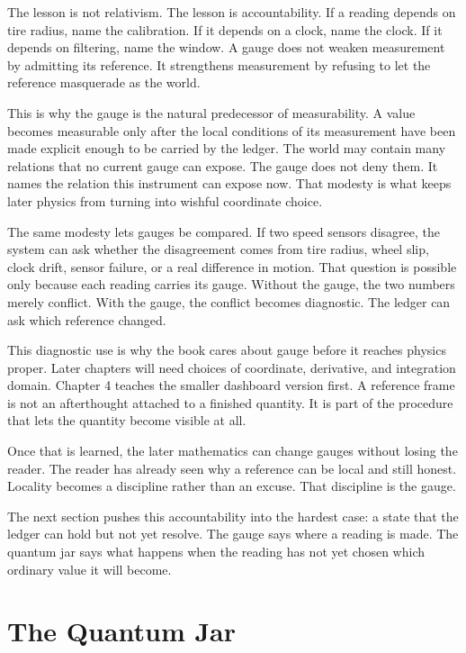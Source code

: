 The lesson is not relativism. The lesson is accountability. If a reading
depends on tire radius, name the calibration. If it depends on a clock, name
the clock. If it depends on filtering, name the window. A gauge does not weaken
measurement by admitting its reference. It strengthens measurement by refusing
to let the reference masquerade as the world.

This is why the gauge is the natural predecessor of measurability. A value
becomes measurable only after the local conditions of its measurement have been
made explicit enough to be carried by the ledger. The world may contain many
relations that no current gauge can expose. The gauge does not deny them. It
names the relation this instrument can expose now. That modesty is what keeps
later physics from turning into wishful coordinate choice.

The same modesty lets gauges be compared. If two speed sensors disagree, the
system can ask whether the disagreement comes from tire radius, wheel slip,
clock drift, sensor failure, or a real difference in motion. That question is
possible only because each reading carries its gauge. Without the gauge, the
two numbers merely conflict. With the gauge, the conflict becomes diagnostic.
The ledger can ask which reference changed.

This diagnostic use is why the book cares about gauge before it reaches
physics proper. Later chapters will need choices of coordinate, derivative,
and integration domain. Chapter 4 teaches the smaller dashboard version first.
A reference frame is not an afterthought attached to a finished quantity. It is
part of the procedure that lets the quantity become visible at all.

Once that is learned, the later mathematics can change gauges without losing
the reader. The reader has already seen why a reference can be local and still
honest.
Locality becomes a discipline rather than an excuse.
That discipline is the gauge.

The next section pushes this accountability into the hardest case: a state
that the ledger can hold but not yet resolve. The gauge says where a reading is
made. The quantum jar says what happens when the reading has not yet chosen
which ordinary value it will become.

\section{The Quantum Jar}
\label{se:quantum-jar}

